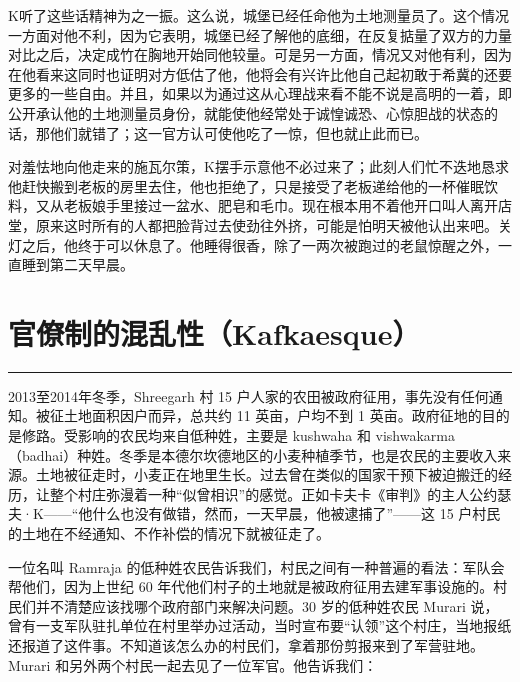 \documentclass[12pt,a4paper]{article}
\begin{document}
K听了这些话精神为之一振。这么说，城堡已经任命他为土地测量员了。这个情况一方面对他不利，因为它表明，城堡已经了解他的底细，在反复掂量了双方的力量对比之后，决定成竹在胸地开始同他较量。可是另一方面，情况又对他有利，因为在他看来这同时也证明对方低估了他，他将会有兴许比他自己起初敢于希冀的还要更多的一些自由。并且，如果以为通过这从心理战来看不能不说是高明的一着，即公开承认他的土地测量员身份，就能使他经常处于诚惶诚恐、心惊胆战的状态的话，那他们就错了；这一官方认可使他吃了一惊，但也就止此而已。

对羞怯地向他走来的施瓦尔策，K摆手示意他不必过来了；此刻人们忙不迭地恳求他赶快搬到老板的房里去住，他也拒绝了，只是接受了老板递给他的一杯催眠饮料，又从老板娘手里接过一盆水、肥皂和毛巾。现在根本用不着他开口叫人离开店堂，原来这时所有的人都把脸背过去使劲往外挤，可能是怕明天被他认出来吧。关灯之后，他终于可以休息了。他睡得很香，除了一两次被跑过的老鼠惊醒之外，一直睡到第二天早晨。
\par{}
\newpage
\section{官僚制的混乱性（Kafkaesque）}
\vspace{0.5em}
\vspace{0.3em}

\noindent\rule{\textwidth}{0.4pt}

\vspace{0.3em}



2013至2014年冬季，Shreegarh 村 15 户人家的农田被政府征用，事先没有任何通知。被征土地面积因户而异，总共约 11 英亩，户均不到 1 英亩。政府征地的目的是修路。受影响的农民均来自低种姓，主要是 kushwaha 和 vishwakarma（badhai）种姓。冬季是本德尔坎德地区的小麦种植季节，也是农民的主要收入来源。土地被征走时，小麦正在地里生长。过去曾在类似的国家干预下被迫搬迁的经历，让整个村庄弥漫着一种“似曾相识”的感觉。正如卡夫卡《审判》的主人公约瑟夫·K——“他什么也没有做错，然而，一天早晨，他被逮捕了”——这 15 户村民的土地在不经通知、不作补偿的情况下就被征走了。



一位名叫 Ramraja 的低种姓农民告诉我们，村民之间有一种普遍的看法：军队会帮他们，因为上世纪 60 年代他们村子的土地就是被政府征用去建军事设施的。村民们并不清楚应该找哪个政府部门来解决问题。30 岁的低种姓农民 Murari 说，曾有一支军队驻扎单位在村里举办过活动，当时宣布要“认领”这个村庄，当地报纸还报道了这件事。不知道该怎么办的村民们，拿着那份剪报来到了军营驻地。Murari 和另外两个村民一起去见了一位军官。他告诉我们：
\end{document}
